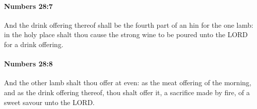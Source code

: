 		\paragraph{Numbers 28:7} %
			\label{NUMBERS-28-7}

			And the drink offering thereof shall be the fourth part of an hin for the one lamb: in the holy place shalt thou cause the strong wine to be poured unto the LORD for a drink offering.


		\paragraph{Numbers 28:8} %
			\label{NUMBERS-28-8}

			And the other lamb shalt thou offer at even: as the meat offering of the morning, and as the drink offering thereof, thou shalt offer it, a sacrifice made by fire, of a sweet savour unto the LORD.

